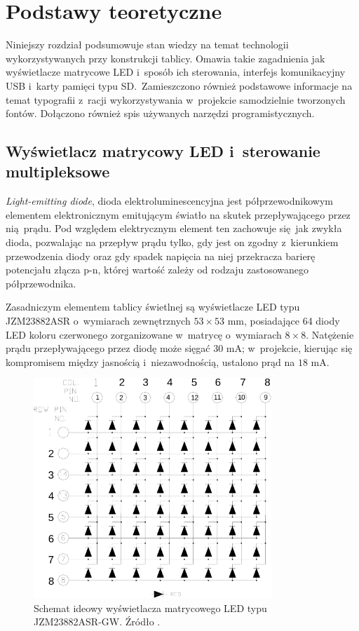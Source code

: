 \chapter{Podstawy teoretyczne}

Niniejszy rozdział podsumowuje stan wiedzy na temat technologii wykorzystywanych przy konstrukcji tablicy. Omawia takie zagadnienia jak wyświetlacze matrycowe LED i~sposób ich sterowania, interfejs komunikacyjny USB i~karty pamięci typu SD.~Zamieszczono również podstawowe informacje na temat typografii z~racji wykorzystywania w~projekcie samodzielnie tworzonych fontów. Dołączono również spis używanych narzędzi programistycznych.

\section{Wyświetlacz matrycowy LED i~sterowanie multipleksowe}

\textit{Light-emitting diode}, dioda elektroluminescencyjna jest półprzewodnikowym elementem elektronicznym emitującym światło na skutek przepływającego przez nią prądu. Pod względem elektrycznym element ten zachowuje się jak zwykła dioda, pozwalając na przepływ prądu tylko, gdy jest on zgodny z~kierunkiem przewodzenia diody oraz gdy spadek napięcia na niej przekracza barierę potencjału złącza p-n, której wartość zależy od rodzaju zastosowanego półprzewodnika. 

Zasadniczym elementem tablicy świetlnej są wyświetlacze LED typu \mbox{JZM23882ASR} o~wymiarach zewnętrznych $53 \times 53$ mm, posiadające 64 diody LED koloru czerwonego zorganizowane w~matrycę o~wymiarach $8 \times 8$. Natężenie prądu przepływającego przez diodę może sięgać $30$ mA; w~projekcie, kierując się kompromisem między jasnością i~niezawodnością, ustalono prąd na $18$ mA.

\begin{figure}[t]
    \begin{center}
       \includegraphics[width=0.8\textwidth]{figures/ledmatrix.pdf}
    \end{center}

    \caption{Schemat ideowy wyświetlacza matrycowego LED typu \mbox{JZM23882ASR-GW}. Źródło \cite{ds-wysw}.}
    \label{schemat-wysw}
\end{figure}

